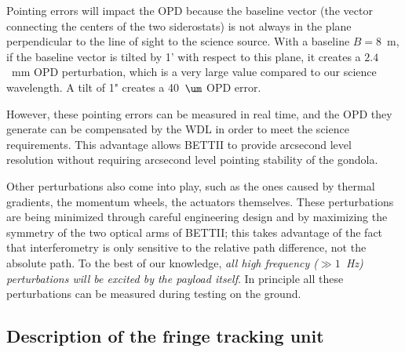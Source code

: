 Pointing errors will impact the OPD because the baseline vector (the vector connecting the centers of the two siderostats) is not always in the plane perpendicular to the line of sight to the science source. With a baseline $B=8$~m, if the baseline vector is tilted by 1' with respect to this plane, it creates a $2.4$~mm OPD perturbation, which is a very large value compared to our science wavelength. A tilt of 1" creates a 40~$\um$ OPD error.

However, these pointing errors can be measured in real time, and the OPD they generate can be compensated by the WDL in order to meet the science requirements. This advantage allows BETTII to provide arcsecond level resolution without requiring arcsecond level pointing stability of the gondola.

Other perturbations also come into play, such as the ones caused by thermal gradients, the momentum wheels, the actuators themselves. These perturbations are being minimized through careful engineering design and by maximizing the symmetry of the two optical arms of BETTII; this takes advantage of the fact that interferometry is only sensitive to the relative path difference, not the absolute path. To the best of our knowledge, \textit{all high frequency ($\gg  1$~Hz) perturbations will be excited by the payload itself}. In principle all these perturbations can be measured during testing on the ground.


\subsection{Description of the fringe tracking unit}\label{subsec:DESCRIPTION}

